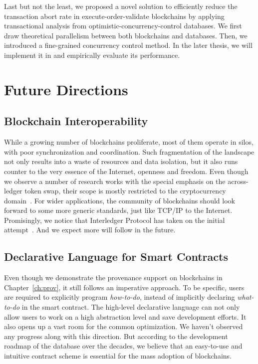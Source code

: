 Last but not the least, we proposed a novel solution to efficiently reduce the transaction abort rate in execute-order-validate blockchains by applying transactional
analysis from optimistic-concurrency-control databases. We first draw theoretical parallelism between both blockchains and databases. Then, we introduced a fine-grained concurrency control method.
In the later thesis, we will implement it in {\fs} and empirically evaluate its performance. 

\section{Future Directions}
\subsection{Blockchain Interoperability}
While a growing number of blockchains proliferate, most of them operate in silos, with poor synchronization and coordination. 
Such fragmentation of the landscape not only results into a waste of resources and data isolation, but it also runs counter to the very essence of the Internet, openness and freedom. 
Even though we observe a number of research works with the special emphasis on the across-ledger token swap, their scope is mostly restricted to the cryptocurrency domain~\cite{herlihy2018atomic,robinson2019atomic,zakhary2019atomic}. 
For wider applications, the community of blockchains should look forward to some more generic standards, just like TCP/IP to the Internet. 
Promisingly, we notice that Interledger Protocol has taken on the initial attempt~\cite{interledger}. And we expect more will follow in the future. 

\subsection{Declarative Language for Smart Contracts}
Even though we demonstrate the provenance support on blockchains in Chapter~\ref{ch:prov}, it still follows an imperative approach.
To be specific, users are required to explicitly program \textit{how-to-do}, instead of implicitly declaring \textit{what-to-do} in the smart contract. 
The high-level declarative language can not only allow users to work on a high abstraction level and save development efforts. 
It also opens up a vast room for the common optimization. 
We haven't observed any progress along with this direction.
But according to the development roadmap of the database over the decades, we believe that an easy-to-use and intuitive contract scheme is essential for the mass adoption of blockchains. 

